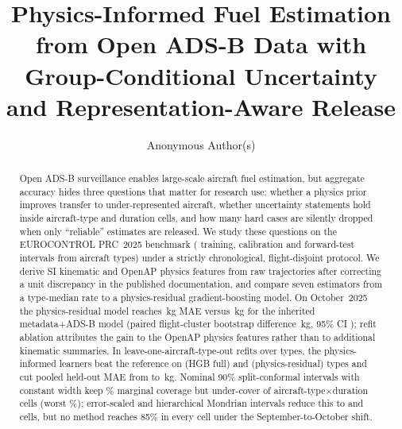 \documentclass[runningheads]{llncs}
\begin{document}
\title{Physics-Informed Fuel Estimation from Open ADS-B Data with Group-Conditional Uncertainty and Representation-Aware Release}

\author{Anonymous Author(s)}

\maketitle

\begin{abstract}
Open ADS-B surveillance enables large-scale aircraft fuel estimation, but aggregate accuracy hides three questions that matter for research use: whether a physics prior improves transfer to under-represented aircraft, whether uncertainty statements hold inside aircraft-type and duration cells, and how many hard cases are silently dropped when only ``reliable'' estimates are released.
We study these questions on the EUROCONTROL PRC~2025 benchmark (\nTrain{} training, \nSep{} calibration and \nOct{} forward-test intervals from \nTypes{} aircraft types) under a strictly chronological, flight-disjoint protocol.
We derive SI kinematic and OpenAP physics features from raw trajectories after correcting a unit discrepancy in the published documentation, and compare seven estimators from a type-median rate to a physics-residual gradient-boosting model.
On October~2025 the physics-residual model reaches \maeHgbResidualPhysicsOct{}\,kg MAE versus \maeHgbMetadataAdsbOct{}\,kg for the inherited metadata+ADS-B model (paired flight-cluster bootstrap difference \deltaHgbResidualPhysicsOct{}\,kg, 95\% CI \deltaCiHgbResidualPhysicsOct{}); refit ablation attributes the gain to the OpenAP physics features rather than to additional kinematic summaries.
In leave-one-aircraft-type-out refits over \lotoTypes{} types, the physics-informed learners beat the reference on \lotoWinsHgbFull{} (HGB full) and \lotoWinsHgbResidualPhysics{} (physics-residual) types and cut pooled held-out MAE from \lotoPooledHgbMetadataAdsb{} to \lotoPooledHgbResidualPhysics{}\,kg.
Nominal 90\% split-conformal intervals with constant width keep \covHgbFullSplitConstant{}\% marginal coverage but under-cover \belowHgbFullSplitConstant{} of \eligibleCells{} aircraft-type$\times$duration cells (worst \worstHgbFullSplitConstant{}\%); error-scaled and hierarchical Mondrian intervals reduce this to \belowHgbFullSplitScaled{} and \belowHgbFullMondrianTypeDuration{} cells, but no method reaches 85\% in every cell under the September-to-October shift.

\end{abstract}
\end{document}
